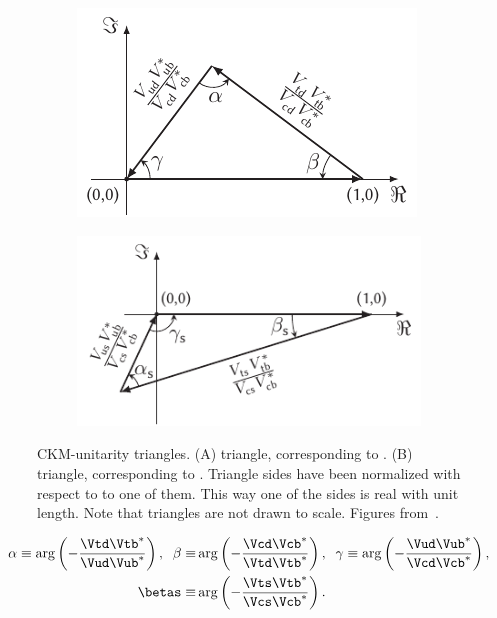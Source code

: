 \begin{figure}[h]
  \centering
  \begin{subfigure}{0.475\textwidth}
    \raggedright
    \includegraphics[width=\textwidth]{Figures/Chapter1/b-d-triangle}
    \caption{}
    \label{unitTriangles_bd}
  \end{subfigure}%
  \begin{subfigure}{0.525\textwidth}
    \raggedleft
    \includegraphics[width=\textwidth]{Figures/Chapter1/b-s-triangle}
    \caption{}
    \label{unitTriangles_bs}
  \end{subfigure}
  \caption{CKM-unitarity triangles. (A) \Bd triangle, corresponding to . (B) \Bs triangle,
           corresponding to . Triangle sides have been normalized with respect to to one of them.
           This way one of the sides is real with unit length. Note that triangles are not drawn to scale. Figures from~\cite{jeroenThesis}. }
  \label{unitTriangles}
\end{figure}

\begin{align}
  \centering
  \alpha \equiv \arg\left( -\frac{\Vtd\Vtb^*}{\Vud\Vub^*} \right),
  \;\;
  \beta  \equiv & \arg\left( -\frac{\Vcd\Vcb^*}{\Vtd\Vtb^*} \right),
  \;\;
  \gamma \equiv \arg\left( -\frac{\Vud\Vub^*}{\Vcd\Vcb^*} \right), \nonumber \\
  \betas \equiv & \arg\left( -\frac{\Vts\Vtb^*}{\Vcs\Vcb^*} \right).
  \label{ckm_angles_def}
\end{align}

